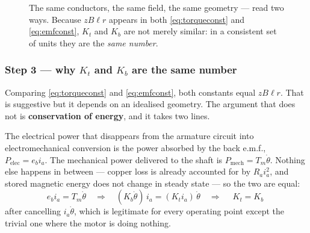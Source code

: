 \documentclass[11pt,a4paper]{article}
\begin{document}
\begin{figure}[H]
\caption{The same conductors, the same field, the same geometry --- read two
ways. Because $zB\ell r$ appears in both \eqref{eq:torqueconst} and
\eqref{eq:emfconst}, $K_{t}$ and $K_{b}$ are not merely similar: in a
consistent set of units they are the \emph{same number}.}
\label{fig:dcmotor}
\end{figure}

\subsubsection{Step 3 --- why $K_{t}$ and $K_{b}$ are the same number}

Comparing \eqref{eq:torqueconst} and \eqref{eq:emfconst}, both constants equal
$zB\ell r$. That is suggestive but it depends on an idealised geometry. The
argument that does not is \textbf{conservation of energy}, and it takes two
lines.

The electrical power that disappears from the armature circuit into
electromechanical conversion is the power absorbed by the back e.m.f.,
$P_{\text{elec}}=e_{b}i_{a}$. The mechanical power delivered to the shaft is
$P_{\text{mech}}=T_{m}\dot\theta$. Nothing else happens in between --- copper
loss is already accounted for by $R_{a}i_{a}^{2}$, and stored magnetic energy
does not change in steady state --- so the two are equal:
\[
  e_{b}i_{a}=T_{m}\dot\theta
  \quad\Longrightarrow\quad
  (K_{b}\dot\theta)\,i_{a}=(K_{t}i_{a})\,\dot\theta
  \quad\Longrightarrow\quad
  \boxed{\;K_{t}=K_{b}\;}
\]
after cancelling $i_{a}\dot\theta$, which is legitimate for every operating
point except the trivial one where the motor is doing nothing.
\end{document}
